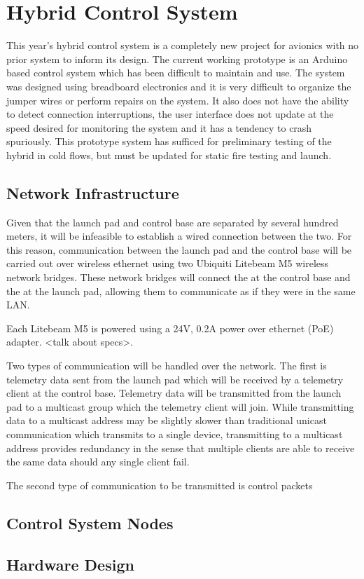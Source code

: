 \section{Hybrid Control System}

This year's hybrid control system is a completely new project for avionics with no prior system to inform its design.
The current working prototype is an Arduino based control system which has been difficult to maintain and use. The
system was designed using breadboard electronics and it is very difficult to organize the jumper wires or perform
repairs on the system. It also does not have the ability to detect connection interruptions, the user interface does not
update at the speed desired for monitoring the system and it has a tendency to crash spuriously. This prototype system
has sufficed for preliminary testing of the hybrid in cold flows, but must be updated for static fire testing and
launch.

\subsection{Network Infrastructure}

Given that the launch pad and control base are separated by several hundred meters, it will be infeasible to establish 
a wired connection between the two. For this reason, communication between the launch pad and the control base will be
carried out over wireless ethernet using two Ubiquiti Litebeam M5 wireless network bridges. These network bridges will connect 
the  at the control base and the  at the launch pad, allowing them to communicate as if they 
were in the same LAN.

Each Litebeam M5 is powered using a 24V, 0.2A power over ethernet (PoE) adapter. <talk about specs>. 

Two types of communication will be handled over the network. The first is telemetry data sent from the launch pad which will be 
received by a telemetry client at the control base. Telemetry data will be transmitted from the launch pad to a 
multicast group which the telemetry client will join. While transmitting data to a  multicast address may be 
slightly slower than traditional  unicast communication which transmits to a single device, transmitting to a 
multicast address provides redundancy in the sense that multiple clients are able to receive the same data should any single client
fail.

The second type of communication to be transmitted is control packets

\subsection{Control System Nodes}

\subsection{Hardware Design}
